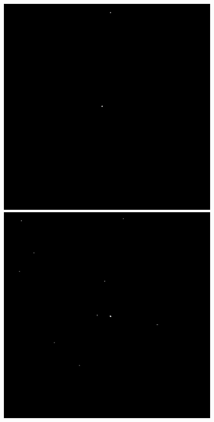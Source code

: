 \begin{figure}
  \includegraphics[width=\linewidth]{Figures/NEATFilteredCentroids1.pdf}
\endminipage\hfill
{}
  \includegraphics[width=\linewidth]{Figures/NEATFilteredCentroids2.pdf}

\end{figure}
